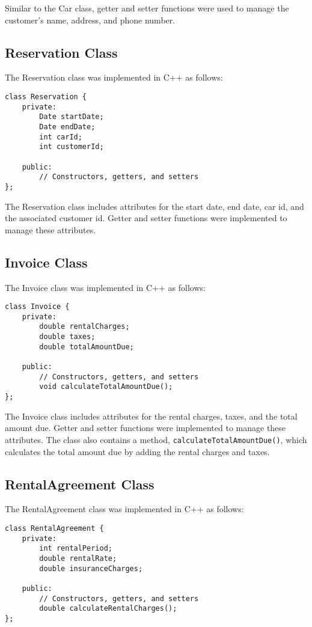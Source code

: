 \documentclass{article}
\begin{document}
Similar to the Car class, getter and setter functions were used to manage the customer's name, address, and phone number.



\subsection{Reservation Class}
The Reservation class was implemented in C++ as follows:

\begin{verbatim}
class Reservation {
    private:
        Date startDate;
        Date endDate;
        int carId;
        int customerId;
    
    public:
        // Constructors, getters, and setters
};
\end{verbatim}

The Reservation class includes attributes for the start date, end date, car id, and the associated customer id. Getter and setter functions were implemented to manage these attributes.

\subsection{Invoice Class}
The Invoice class was implemented in C++ as follows:

\begin{verbatim}
class Invoice {
    private:
        double rentalCharges;
        double taxes;
        double totalAmountDue;
    
    public:
        // Constructors, getters, and setters
        void calculateTotalAmountDue();
};
\end{verbatim}

The Invoice class includes attributes for the rental charges, taxes, and the total amount due. Getter and setter functions were implemented to manage these attributes. The class also contains a method, \texttt{calculateTotalAmountDue()}, which calculates the total amount due by adding the rental charges and taxes.

\subsection{RentalAgreement Class}
The RentalAgreement class was implemented in C++ as follows:

\begin{verbatim}
class RentalAgreement {
    private:
        int rentalPeriod;
        double rentalRate;
        double insuranceCharges;
    
    public:
        // Constructors, getters, and setters
        double calculateRentalCharges();
};
\end{verbatim}
\end{document}
